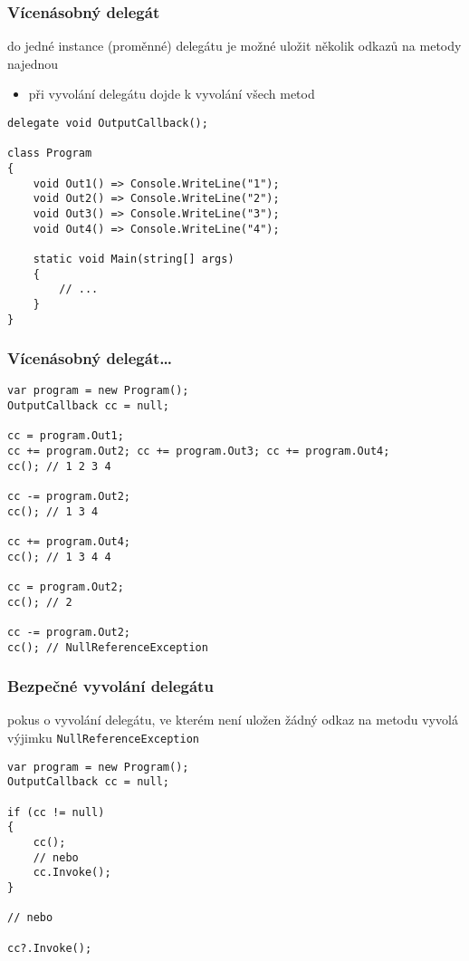 \begin{frame}[fragile]
\frametitle{Vícenásobný delegát}
\vfill
\begin{bitemize}{}
\item do jedné instance (proměnné) delegátu je možné uložit několik odkazů na metody najednou
\begin{itemize}
\item při vyvolání delegátu dojde k vyvolání všech metod
\end{itemize}

\end{bitemize}
\vfill
\begin{yesblock}
\begin{lstlisting}
delegate void OutputCallback();

class Program
{
    void Out1() => Console.WriteLine("1");
    void Out2() => Console.WriteLine("2");
    void Out3() => Console.WriteLine("3");
    void Out4() => Console.WriteLine("4");

    static void Main(string[] args)
    {
        // ...
    }
}
\end{lstlisting}
\end{yesblock}
\vfill
\end{frame}




\begin{frame}[fragile]
\frametitle{Vícenásobný delegát\ldots}
\begin{yesblock}
\begin{lstlisting}
var program = new Program();
OutputCallback cc = null;

cc = program.Out1;
cc += program.Out2; cc += program.Out3; cc += program.Out4;
cc(); // 1 2 3 4

cc -= program.Out2;
cc(); // 1 3 4 

cc += program.Out4;
cc(); // 1 3 4 4

cc = program.Out2;
cc(); // 2

cc -= program.Out2;
cc(); // NullReferenceException
\end{lstlisting}
\end{yesblock}
\end{frame}




\begin{frame}[fragile]
\frametitle{Bezpečné vyvolání delegátu}
\vfill
\begin{bitemize}{}
\item pokus o vyvolání delegátu, ve kterém není uložen žádný odkaz na metodu vyvolá výjimku \lstinline|NullReferenceException|
\end{bitemize}
\vfill
\begin{yesblock}
\begin{lstlisting}
var program = new Program();
OutputCallback cc = null;

if (cc != null)
{
    cc();
    // nebo
    cc.Invoke();
}

// nebo

cc?.Invoke();
\end{lstlisting}
\end{yesblock}
\vfill
\end{frame}




